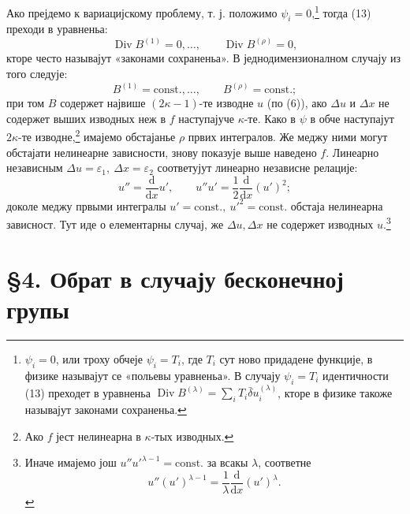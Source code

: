 ﻿\documentclass[11pt]{article}
\providecommand{\eps}{\varepsilon}
\providecommand{\D}{\Delta}
\providecommand{\dd}{\mathrm d}
\DeclareMathOperator{\Div}{Div}
\providecommand{\bd}{\bar{\delta}}
\begin{document}
Ако прејдемо к вариацијскому проблему, т. ј. положимо \(\psi_i=0\),\footnote{\(\psi_i=0\), или троху обчеје \(\psi_i=T_i\), где \(T_i\) сут ново придадене функције, в физике называјут се «польевы уравненьа». В случају \(\psi_i=T_i\) идентичности (13) преходет в уравненьа \(\Div B^{(\lambda)}=\sum_i T_i\bd u_i^{(\lambda)}\), кторе в физике такоже называјут законами сохраненьа.} тогда (13) преходи в уравненьа:
\[
\Div B^{(1)}=0,\ldots,\qquad \Div B^{(\rho)}=0,
\]
кторе често называјут «законами сохраненьа». В једнодимензионалном случају из того следује:
\[
B^{(1)}=\mathrm{const.},\ldots,\qquad B^{(\rho)}=\mathrm{const.};
\]
при том \(B\) содержет највише \((2\kappa-1)\)-те изводне \(u\) (по (6)), ако \(\D u\) и \(\D x\) не содержет выших изводных неж в \(f\) наступајуче \(\kappa\)-те. Како в \(\psi\) в обче наступајут \(2\kappa\)-те изводне,\footnote{Ако \(f\) јест нелинеарна в \(\kappa\)-тых изводных.} имајемо обстајанье \(\rho\) првих интегралов. Же меджу ними могут обстајати нелинеарне зависности, знову показује выше наведено \(f\). Линеарно независным \(\D u=\eps_1,\ \D x=\eps_2\) соответујут линеарно независне релације:
\[
u''=\frac{\dd}{\dd x}u',\qquad
u''u'=\frac12\frac{\dd}{\dd x}(u')^2;
\]
доколе меджу првыми интегралы \(u'=\mathrm{const.},\ u'^2=\mathrm{const.}\) обстаја нелинеарна зависност. Тут иде о елементарны случај, же \(\D u,\D x\) не содержет изводных \(u\).\footnote{Иначе имајемо још \(u''u'^{\lambda-1}=\mathrm{const.}\) за всакы \(\lambda\), соответне
\[
u''(u')^{\lambda-1}=\frac1\lambda\frac{\dd}{\dd x}(u')^\lambda.
\]}

\section*{\S{}4. Обрат в случају бесконечној групы}
\end{document}
